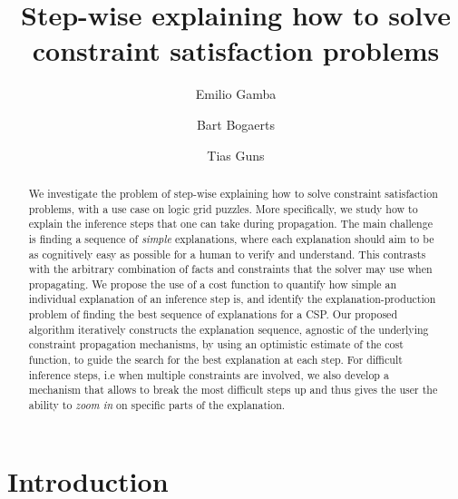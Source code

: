 \documentclass{llncs}
\begin{document}
%
\title{Step-wise explaining how to solve constraint satisfaction problems}
%
%
\author{Emilio Gamba \and
Bart Bogaerts \and
Tias Guns}

%
\maketitle

\begin{abstract}
We investigate the problem of step-wise explaining how to solve constraint satisfaction problems, with a use case on logic grid puzzles.
More specifically, we study how to explain the inference steps that one can take during propagation.
The main challenge is finding a sequence of \textit{simple} explanations, where each explanation should aim to be as cognitively easy as possible for a human to verify and understand.
This contrasts with the arbitrary combination of facts and constraints that the solver may use  when propagating.
We propose the use of a cost function to quantify how simple an individual explanation of an inference step is, and identify the explanation-production problem of finding the best sequence of explanations for a CSP.
Our proposed algorithm iteratively constructs the explanation sequence, agnostic of the underlying constraint propagation mechanisms, by using an optimistic estimate of the cost function, to guide the search for the best explanation at each step.
For difficult inference steps, i.e when multiple constraints are involved, we also develop a mechanism that allows to break the most difficult steps up and thus gives the user the ability to \emph{zoom in} on specific parts of the explanation.
\end{abstract}
%
%
\section{Introduction}\label{sec:intro}

\end{document}
